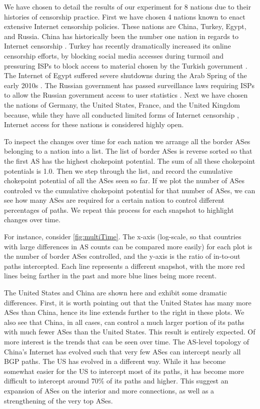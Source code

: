 We have chosen to detail the results of our experiment for 8 nations due to
their histories of censorship practice. First we have chosen 4 nations known to
enact extensive Internet censorship policies. These nations are China, Turkey,
Egypt, and Russia. China has historically been the number one nation in regards
to Internet censorship \cite{censorshipSurvey}. Turkey has recently
dramatically increased its online censorship efforts, by blocking social media
accesses during turmoil and pressuring ISPs to block access to material chosen
by the Turkish government \cite{turkeyCensor}. The Internet of Egypt suffered
severe shutdowns during the Arab Spring of the early 2010s \cite{arabspring}.
The Russian government has passed surveillance laws requiring ISPs to allow the
Russian government access to user statistics \cite{censorshipGeography}. Next
we have chosen the nations of Germany, the United States, France, and the
United Kingdom because, while they have all conducted limited forms of Internet
censorship \cite{censorshipSurvey}, Internet access for these nations is
considered highly open.

To inspect the changes over time for each nation we arrange all the border ASes
belonging to a nation into a list. The list of border ASes is reverse sorted so
that the first AS has the highest chokepoint potential. The sum of all these
chokepoint potentials is 1.0. Then we step through the list, and record the
cumulative chokepoint potential of all the ASes seen so far. If we plot the
number of ASes controled vs the cumulative chokepoint potential for that number
of ASes, we can see how many ASes are required for a certain nation to control
different percentages of paths. We repeat this process for each snapshot to
highlight changes over time.

For instance, consider \figurename \ref{fig:multiTime}.  The x-axis (log-scale,
so that countries with large differences in AS counts can be compared more
easily) for each plot is the number of border ASes controlled, and the y-axis
is the ratio of in-to-out paths intercepted. Each line represents a different
snapshot, with the more red lines being farther in the past and more blue lines
being more recent.

The United States and China are shown here and exhibit some dramatic
differences. First, it is worth pointing out that the United States has many
more ASes than China, hence its line extends further to the right in these
plots. We also see that China, in all cases, can control a much larger portion
of its paths with much fewer ASes than the United States. This result is
entirely expected. Of more interest is the trends that can be seen over time.
The AS-level topology of China's Internet has evolved such that very few ASes
can intercept nearly all BGP paths. The US has evolved in a different way.
While it has become somewhat easier for the US to intercept most of its paths,
it has become more difficult to intercept around 70\% of its paths and higher.
This suggest an expansion of ASes on the interior and more connections, as well
as a strengthening of the very top ASes.

